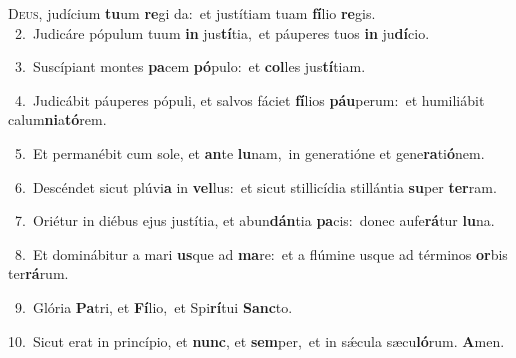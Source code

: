 \lettrine{\initial\textcolor{\initialcolor}{D}}{eus,} judícium \textbf{tu}\-um \textbf{re}\-gi da:~\star et justítiam tuam \textbf{fí}\-lio \textbf{re}\-gis.\\
{\numbfont\textcolor{\numbcolor}{~2.}}~Judicáre pópulum tuum \textbf{in} jus\-\textbf{tí}\-tia,~\star et páuperes tuos \textbf{in} ju\-\textbf{dí}\-cio.\par
{\numbfont\textcolor{\numbcolor}{~3.}}~Suscípiant montes \textbf{pa}\-cem \textbf{pó}\-pulo:~\star et \textbf{col}\-les jus\-\textbf{tí}\-tiam.\par
{\numbfont\textcolor{\numbcolor}{~4.}}~Judicábit páuperes pópuli, et salvos fáciet \textbf{fí}\-lios \textbf{páu}\-perum:~\star et humiliábit calum\-\textbf{ni}\-a\-\textbf{tó}\-rem.\par
{\numbfont\textcolor{\numbcolor}{~5.}}~Et permanébit cum sole, et \textbf{an}\-te \textbf{lu}\-nam,~\star in generatióne et gene\-\textbf{ra}\-ti\-\textbf{ó}\-nem.\par
{\numbfont\textcolor{\numbcolor}{~6.}}~Descéndet sicut plúvi\textbf{a} in \textbf{vel}\-lus:~\star et sicut stillicídia stillántia \textbf{su}\-per \textbf{ter}\-ram.\par
{\numbfont\textcolor{\numbcolor}{~7.}}~Oriétur in diébus ejus justítia, et abun\-\textbf{dán}\-tia \textbf{pa}\-cis:~\star donec aufe\-\textbf{rá}\-tur \textbf{lu}\-na.\par
{\numbfont\textcolor{\numbcolor}{~8.}}~Et dominábitur a mari \textbf{us}\-que ad \textbf{ma}\-re:~\star et a flúmine usque ad términos \textbf{or}\-bis ter\-\textbf{rá}\-rum.\par
{\numbfont\textcolor{\numbcolor}{~9.}}~Glória \textbf{Pa}\-tri, et \textbf{Fí}\-lio,~\star et Spi\-\textbf{rí}\-tui \textbf{Sanc}\-to.\par
{\numbfont\textcolor{\numbcolor}{10.}}~Sicut erat in princípio, et \textbf{nunc}\-, et \textbf{sem}\-per,~\star et in sǽcula sæcu\-\textbf{ló}\-rum. \textbf{A}\-men.\par
